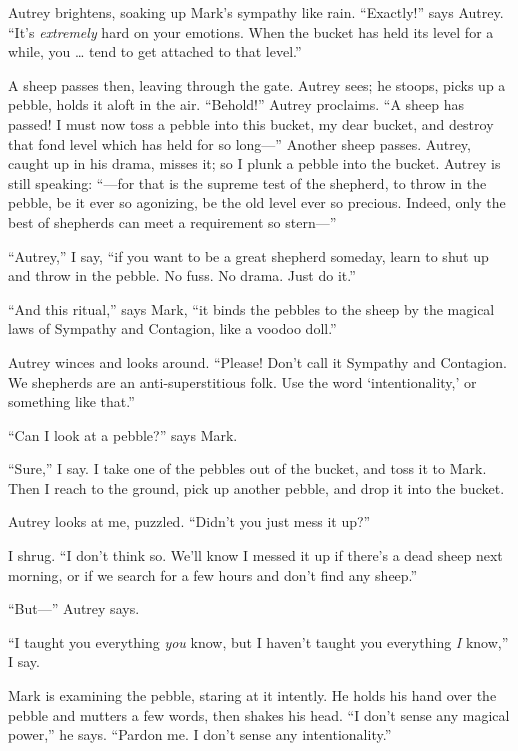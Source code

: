{
 Autrey brightens, soaking up Mark's sympathy like
rain. ``Exactly!'' says Autrey.
``It's \textit{extremely} hard on your
emotions. When the bucket has held its level for a while, you \ldots
tend to get attached to that level.''}

{
 A sheep passes then, leaving through the gate. Autrey sees; he
stoops, picks up a pebble, holds it aloft in the air.
``Behold!'' Autrey proclaims.
``A sheep has passed! I must now toss a pebble into
this bucket, my dear bucket, and destroy that fond level which has held
for so long---'' Another sheep passes. Autrey, caught
up in his drama, misses it; so I plunk a pebble into the bucket. Autrey
is still speaking: ``---for that is the supreme test
of the shepherd, to throw in the pebble, be it ever so agonizing, be
the old level ever so precious. Indeed, only the best of shepherds can
meet a requirement so stern---''}

{
 ``Autrey,'' I say,
``if you want to be a great shepherd someday, learn to
shut up and throw in the pebble. No fuss. No drama. Just do
it.''}

{
 ``And this ritual,'' says Mark,
``it binds the pebbles to the sheep by the magical
laws of Sympathy and Contagion, like a voodoo
doll.''}

{
 Autrey winces and looks around. ``Please!
Don't call it Sympathy and Contagion. We shepherds are
an anti-superstitious folk. Use the word
`intentionality,' or something like
that.''}

{
 ``Can I look at a pebble?''
says Mark.}

{
 ``Sure,'' I say. I take one of
the pebbles out of the bucket, and toss it to Mark. Then I reach to the
ground, pick up another pebble, and drop it into the bucket.}

{
 Autrey looks at me, puzzled.
``Didn't you just mess it
up?''}

{
 I shrug. ``I don't think so.
We'll know I messed it up if there's a
dead sheep next morning, or if we search for a few hours and
don't find any sheep.''}

{
 ``But---'' Autrey says.}

{
 ``I taught you everything \textit{you} know, but
I haven't taught you everything \textit{I}
know,'' I say.}

{
 Mark is examining the pebble, staring at it intently. He holds his
hand over the pebble and mutters a few words, then shakes his head.
``I don't sense any magical
power,'' he says. ``Pardon me. I
don't sense any intentionality.''}

